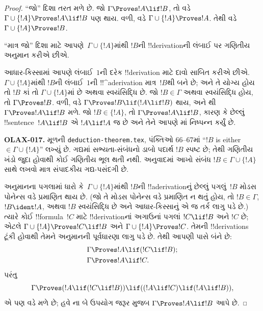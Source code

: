\documentclass[../../../include/open-logic-section]{subfiles}
\begin{document}
\begin{proof}
``જો'' દિશા તરત મળે છે. જો $\Gamma \Proves !A \lif !B$, તો
 વડે $\Gamma \cup \{!A\} \Proves !A \lif
!B$ પણ થાય. વળી,  વડે
$\Gamma \cup \{!A\} \Proves !A$. તેથી  વડે
$\Gamma \cup \{!A\} \Proves !B$.

``માત્ર જો'' દિશા માટે આપણે~$\Gamma \cup \{!A\}$માંથી $!B$ની
!!{derivation}ની લંબાઈ પર ગણિતીય અનુમાન કરીએ છીએ.

આધાર-કિસ્સામાં આપણે લંબાઈ~$1$ની દરેક !!{derivation} માટે દાવો સાબિત
કરીએ છીએ. $\Gamma \cup \{!A\}$માંથી $!B$ની લંબાઈ~$1$ની
!!^a{derivation} માત્ર~$!B$થી બને છે; અને તે યોગ્ય હોય તો $!B$ કાં તો
$\Gamma \cup \{!A\}$માં છે અથવા સ્વયંસિદ્ધિ છે. જો $!B \in \Gamma$
અથવા સ્વયંસિદ્ધિ હોય, તો $\Gamma \Proves !B$. વળી,
 વડે $\Gamma \Proves !B \lif (!A \lif !B)$ થાય,
અને થી $\Gamma \Proves !A \lif !B$ મળે. જો
$!B \in \{!A\}$, તો $\Gamma \Proves !A \lif !B$, કારણ કે છેલ્લું
!!{sentence}~$!A \lif !B$ એ $!A \lif !A$ જ છે અને તેને આપણે
માં નિષ્પન્ન કર્યું છે.

\begin{editorial}
\textbf{OLAX-017.} મૂળની \texttt{deduction-theorem.tex}, પંક્તિઓ 66--67માં “$!B$ is either $\in\Gamma\cup\{!A\}$” લખ્યું છે. ગદ્યમાં સભ્યતા-સંબંધનો ડાબો પદાર્થ $!B$ સ્પષ્ટ છે; તેથી ગણિતીય ખંડો જુદા હોવાથી કોઈ ગણિતીય ભૂલ થતી નથી. અનુવાદમાં આખો સંબંધ $!B\in\Gamma\cup\{!A\}$ સાથે લખવો માત્ર સંપાદકીય ગદ્ય-પસંદગી છે.
\end{editorial}

અનુમાનના પગલામાં ધારો કે~$\Gamma \cup \{!A\}$માંથી $!B$ની
!!a{derivation}નું છેલ્લું પગલું~$!B$ મોડસ પોનેન્સ વડે પ્રમાણિત થાય છે.
(જો તે મોડસ પોનેન્સ વડે પ્રમાણિત ન થતું હોય, તો $!B \in \Gamma$,
$!B \ident !A$, અથવા $!B$ સ્વયંસિદ્ધિ છે અને આધાર-કિસ્સાનું એ જ તર્ક
લાગુ પડે છે.) ત્યારે કોઈ !!{formula}~$!C$ માટે !!{derivation}નાં અગાઉનાં
પગલાં $!C \lif !B$ અને $!C$ છે; એટલે
$\Gamma \cup \{!A\} \Proves !C \lif !B$ અને
$\Gamma \cup \{!A\} \Proves !C$. તેમની !!{derivation}s ટૂંકી હોવાથી
તેમને અનુમાનની પૂર્વધારણા લાગુ પડે છે. તેથી આપણી પાસે બંને છે:
\begin{align*}
  & \Gamma \Proves !A \lif (!C \lif !B); \\
  & \Gamma \Proves !A \lif !C.
\end{align*}
પરંતુ
\[
\Gamma \Proves (!A \lif (!C \lif !B)) \lif
((!A\lif !C)  \lif (!A \lif !B)),
\]
એ પણ  વડે મળે છે; હવે ના બે ઉપયોગ
જરૂર મુજબ $\Gamma \Proves !A \lif !B$ આપે છે.
\end{proof}
\end{document}
